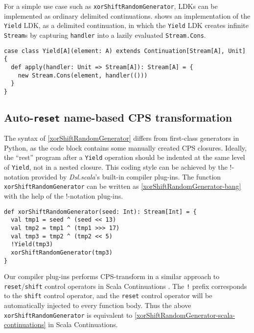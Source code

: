 For a simple use case such as \lstinline{xorShiftRandomGenerator}, LDKs can be implemented as ordinary delimited continuations.  shows an implementation of the \lstinline{Yield} LDK, as a delimited continuation, in which the \lstinline{Yield} LDK creates infinite \lstinline{Stream}s by capturing \lstinline{handler} into a lazily evaluated \lstinline{Stream.Cons}.

\begin{lstlisting}[caption={Implementing \lstinline{Yield} LDK as an ordinary delimited continuation},label={NonadaptiveYield}]
case class Yield[A](element: A) extends Continuation[Stream[A], Unit] {
  def apply(handler: Unit => Stream[A]): Stream[A] = {
    new Stream.Cons(element, handler(()))
  }
}
\end{lstlisting}

\subsection{Auto-\lstinline{reset} name-based CPS transformation}\label{CPS transformation}

The syntax of \cref{xorShiftRandomGenerator} differs from first-class generators in Python, as the code block contains some manually created CPS closures. Ideally, the ``rest'' program after a \lstinline{Yield} operation should be indented at the same level of \lstinline{Yield}, not in a nested closure. This coding style can be achieved by the !-notation provided by \textit{Dsl.scala}'s built-in compiler plug-ins. The function \lstinline{xorShiftRandomGenerator} can be written as \cref{xorShiftRandomGenerator-bang} with the help of the !-notation plug-ins.

\begin{lstlisting}[caption={TheXorshift pseudo-random number generator,  in the style of !-notation},label={xorShiftRandomGenerator-bang}]
def xorShiftRandomGenerator(seed: Int): Stream[Int] = {
  val tmp1 = seed ^ (seed << 13)
  val tmp2 = tmp1 ^ (tmp1 >>> 17)
  val tmp3 = tmp2 ^ (tmp2 << 5)
  !Yield(tmp3)
  xorShiftRandomGenerator(tmp3)
}
\end{lstlisting}

Our compiler plug-ins performs CPS-transform in a similar approach to \lstinline{reset}/\lstinline{shift} control operators in Scala Continuations \cite{rompf2009implementing}. The \lstinline{!} prefix corresponds to the \lstinline{shift} control operator, and the \lstinline{reset} control operator will be automatically injected to every function body. Thus the above \lstinline{xorShiftRandomGenerator} is equivalent to \cref{xorShiftRandomGenerator-scala-continuations} in Scala Continuations.

